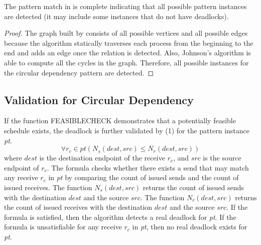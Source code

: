 \begin{lemma}
\label{lemma:pmcircular}
The pattern match in  is complete indicating that all possible pattern instances are detected (it may include some instances that do not have deadlocks).
\end{lemma}
\begin{proof}
The graph built by  consists of all possible vertices and all possible edges because the algorithm statically traverses each process from the beginning to the end and adds an edge once the relation is detected. Also, Johnson's algorithm is able to compute all the cycles in the graph. Therefore, all possible instances for the circular dependency pattern are detected. 
\end{proof}

\subsection{Validation for Circular Dependency}


If the function \textrm{FEASIBLECHECK} demonstrates that a potentially feasible schedule exists, the deadlock is further validated by (1) for the pattern instance \textit{pt}. 
\begin{equation}
\forall r_c\in \mathit{pt}(\mathit{N_s}(\mathit{dest},\mathit{src}) \leq \mathit{N_r}(\mathit{dest},\mathit{src}))
\end{equation}
where $\mathit{dest}$ is the destination endpoint of the receive $r_c$, and $\mathit{src}$ is the source endpoint of $r_c$. 
The formula checks whether there exists a send that may match any receive $\mathit{r_c}$ in \textit{pt} by comparing the count of issued sends and the count of issued receives.    
The function $\mathit{N_s}(\mathit{dest},\mathit{src})$ returns the count of issued sends with the destination $\mathit{dest}$ and the source $\mathit{src}$. The function $\mathit{N_r}(\mathit{dest},\mathit{src})$ returns the count of issued receives with the destination $\mathit{dest}$ and the source $\mathit{src}$.
If the formula is satisfied, then the algorithm detects a real deadlock for \textit{pt}.
If the formula is unsatisfiable for any receive $r_c$ in \textit{pt}, then no real deadlock exists for \textit{pt}.

